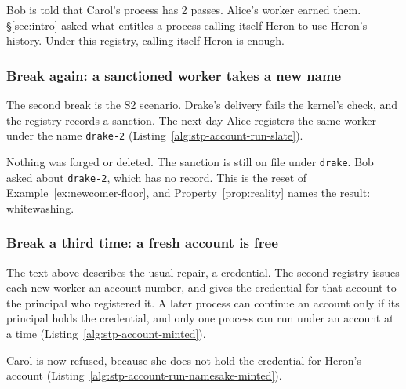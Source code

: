 Bob is told that Carol's process has 2 passes. Alice's worker earned
them. \S\ref{sec:intro} asked what entitles a process calling itself
Heron to use Heron's history. Under this registry, calling itself Heron
is enough.

\subsubsection{Break again: a sanctioned worker takes a new name}

The second break is the S2 scenario. Drake's delivery fails the kernel's
check, and the registry records a sanction. The next day Alice registers
the same worker under the name \texttt{drake-2}
(Listing~\ref{alg:stp-account-run-slate}).


Nothing was forged or deleted. The sanction is still on file under
\texttt{drake}. Bob asked about \texttt{drake-2}, which has no record.
This is the reset of Example~\ref{ex:newcomer-floor}, and
Property~\ref{prop:reality} names the result: whitewashing.

\subsubsection{Break a third time: a fresh account is free}

The text above describes the usual repair, a credential. The second
registry issues each new worker an account number, and gives the
credential for that account to the principal who registered it. A later
process can continue an account only if its principal holds the
credential, and only one process can run under an account at a time
(Listing~\ref{alg:stp-account-minted}).


Carol is now refused, because she does not hold the credential for
Heron's account (Listing~\ref{alg:stp-account-run-namesake-minted}).


